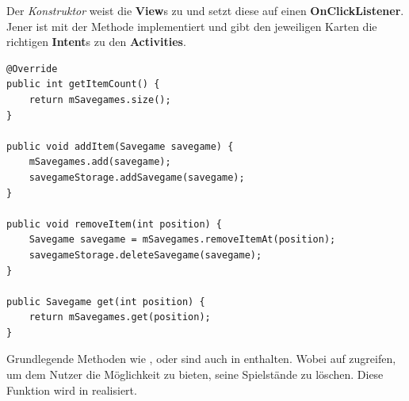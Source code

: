 Der \emph{Konstruktor} weist die \textbf{View}s zu und setzt diese auf einen
\textbf{OnClickListener}. Jener ist mit der Methode 
implementiert und gibt den jeweiligen Karten die richtigen \textbf{Intent}s zu
den \textbf{Activities}.\\

\begin{lstlisting}[caption={SavegameAdapter Grundlegende Methoden},captionpos=b]
@Override
public int getItemCount() {
	return mSavegames.size();
}

public void addItem(Savegame savegame) {
	mSavegames.add(savegame);
	savegameStorage.addSavegame(savegame);
}

public void removeItem(int position) {
	Savegame savegame = mSavegames.removeItemAt(position);
	savegameStorage.deleteSavegame(savegame);
}

public Savegame get(int position) {
	return mSavegames.get(position);
}
\end{lstlisting}

Grundlegende Methoden wie ,
 oder  sind auch in
 enthalten. Wobei  auf 
 zugreifen, um dem Nutzer die Möglichkeit zu bieten,
seine Spielstände zu löschen. Diese Funktion wird in 
realisiert.
